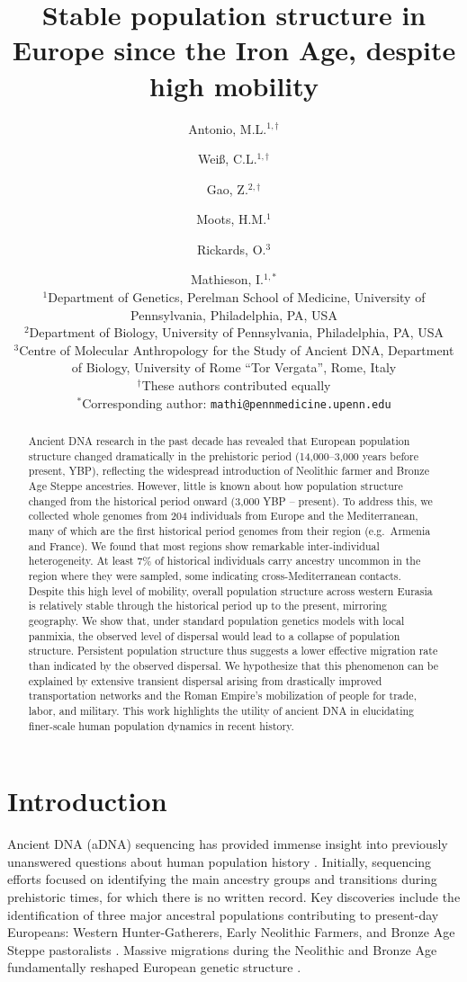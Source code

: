 \documentclass[11pt]{article}
\title{Stable population structure in Europe since the Iron Age, despite high mobility}
\author{
Antonio, M.L.$^{1,\dagger}$ \and Weiß, C.L.$^{1,\dagger}$ \and Gao, Z.$^{2,\dagger}$ \and Moots, H.M.$^{1}$ \and Rickards, O.$^{3}$ \and Mathieson, I.$^{1,*}$\\[6pt]
\small $^{1}$Department of Genetics, Perelman School of Medicine, University of Pennsylvania, Philadelphia, PA, USA\\
\small $^{2}$Department of Biology, University of Pennsylvania, Philadelphia, PA, USA\\
\small $^{3}$Centre of Molecular Anthropology for the Study of Ancient DNA, Department of Biology, University of Rome ``Tor Vergata'', Rome, Italy\\
\small $^{\dagger}$These authors contributed equally\\
\small $^{*}$Corresponding author: \texttt{mathi@pennmedicine.upenn.edu}
}
\date{}
\begin{document}
\maketitle

\begin{abstract}
Ancient DNA research in the past decade has revealed that European population structure changed dramatically in the prehistoric period (14,000--3,000 years before present, YBP), reflecting the widespread introduction of Neolithic farmer and Bronze Age Steppe ancestries. However, little is known about how population structure changed from the historical period onward (3,000 YBP -- present). To address this, we collected whole genomes from 204 individuals from Europe and the Mediterranean, many of which are the first historical period genomes from their region (e.g.\ Armenia and France). We found that most regions show remarkable inter-individual heterogeneity. At least 7\% of historical individuals carry ancestry uncommon in the region where they were sampled, some indicating cross-Mediterranean contacts. Despite this high level of mobility, overall population structure across western Eurasia is relatively stable through the historical period up to the present, mirroring geography. We show that, under standard population genetics models with local panmixia, the observed level of dispersal would lead to a collapse of population structure. Persistent population structure thus suggests a lower effective migration rate than indicated by the observed dispersal. We hypothesize that this phenomenon can be explained by extensive transient dispersal arising from drastically improved transportation networks and the Roman Empire's mobilization of people for trade, labor, and military. This work highlights the utility of ancient DNA in elucidating finer-scale human population dynamics in recent history.
\end{abstract}

\section{Introduction}

Ancient DNA (aDNA) sequencing has provided immense insight into previously unanswered questions about human population history \citep{haak2015, lazaridis2014, fu2016, allentoft2015}. Initially, sequencing efforts focused on identifying the main ancestry groups and transitions during prehistoric times, for which there is no written record. Key discoveries include the identification of three major ancestral populations contributing to present-day Europeans: Western Hunter-Gatherers, Early Neolithic Farmers, and Bronze Age Steppe pastoralists \citep{lazaridis2014, haak2015}. Massive migrations during the Neolithic and Bronze Age fundamentally reshaped European genetic structure \citep{allentoft2015, brace2019, cassidy2016}.
\end{document}
